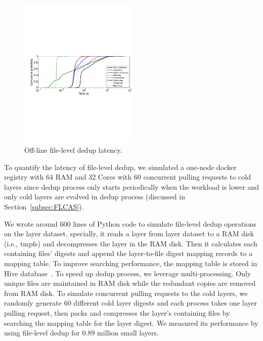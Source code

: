 \begin{figure}
	\centering
	\includegraphics[width=0.5\textwidth]{graphs/res-time.pdf}
	\caption{Off-line file-level dedup latency.
	}
	\label{fig:dedup-res}
\end{figure}

To quantify the latency of file-level dedup, we simulated a one-node docker registry with 64 RAM and 32 Cores with 60 concurrent pulling requests to cold layers since dedup process only starts periodically when the workload is lower and only cold layers are evolved in dedup process (discussed in Section~\ref{subsec:FLCAS}).
%
%

We wrote around 600 lines of Python code to simulate file-level dedup operations on the layer dataset, specially, it reads a layer from layer dataset to a RAM disk (i.e., tmpfs) and decompresses the layer in the RAM disk. Then it calculates each containing files' digests and append the layer-to-file digest mapping records to a mapping table.
To improve searching performance, the mapping table is stored in Hive database~\cite{xxx}.
%
%
To speed up dedup process, we leverage multi-processing. Only unique files are maintained in RAM disk while the redundant copies are removed from RAM disk. To simulate concurrent pulling requests to the cold layers, we randomly generate 60 different cold layer digests and each process takes one layer pulling request, then packs and compresses the layer's containing files by searching the mapping table for the layer digest. We measured its performance by using file-level dedup for 0.89 million small layers.
%


